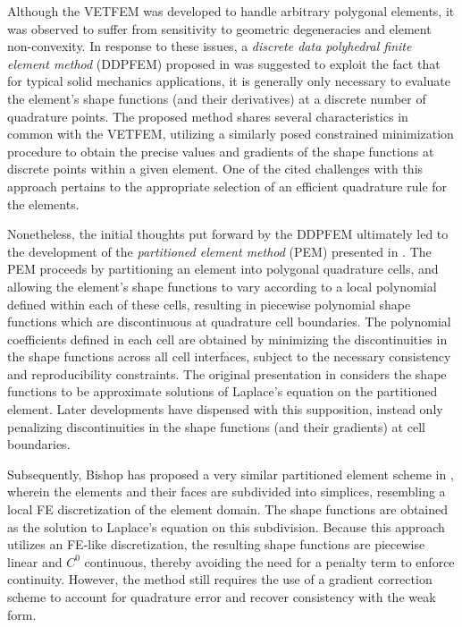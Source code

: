 		Although the VETFEM was developed to handle arbitrary polygonal elements, it was observed to suffer from sensitivity to geometric degeneracies and element non-convexity. In response to these issues, a \textit{discrete data polyhedral finite element method} (DDPFEM) proposed in \cite{Selimotic:08} was suggested to exploit the fact that for typical solid mechanics applications, it is generally only necessary to evaluate the element's shape functions (and their derivatives) at a discrete number of quadrature points. The proposed method shares several characteristics in common with the VETFEM, utilizing a similarly posed constrained minimization procedure to obtain the precise values and gradients of the shape functions at discrete points within a given element. One of the cited challenges with this approach pertains to the appropriate selection of an efficient quadrature rule for the elements.
			
		Nonetheless, the initial thoughts put forward by the DDPFEM ultimately led to the development of the \textit{partitioned element method} (PEM) presented in \cite{Rashid:12}. The PEM proceeds by partitioning an element into polygonal quadrature cells, and allowing the element's shape functions to vary according to a local polynomial defined within each of these cells, resulting in piecewise polynomial shape functions which are discontinuous at quadrature cell boundaries. The polynomial coefficients defined in each cell are obtained by minimizing the discontinuities in the shape functions across all cell interfaces, subject to the necessary consistency and reproducibility constraints. The original presentation in \cite{Rashid:12} considers the shape functions to be approximate solutions of Laplace's equation on the partitioned element. Later developments have dispensed with this supposition, instead only penalizing discontinuities in the shape functions (and their gradients) at cell boundaries.
			
		Subsequently, Bishop has proposed a very similar partitioned element scheme in \cite{Bishop:14}, wherein the elements and their faces are subdivided into simplices, resembling a local FE discretization of the element domain. The shape functions are obtained as the solution to Laplace's equation on this subdivision. Because this approach utilizes an FE-like discretization, the resulting shape functions are piecewise linear and $C^0$ continuous, thereby avoiding the need for a penalty term to enforce continuity. However, the method still requires the use of a gradient correction scheme to account for quadrature error and recover consistency with the weak form.

